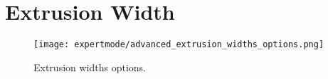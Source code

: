 
\section{Extrusion Width} %
\label{sec:extrusion_width}

\begin{figure}[H]
\centering
\texttt{[image: expertmode/advanced\_extrusion\_widths\_options.png]}
\caption{Extrusion widths options.}
\label{fig:advanced_extrusion_widths_options}
\end{figure}


